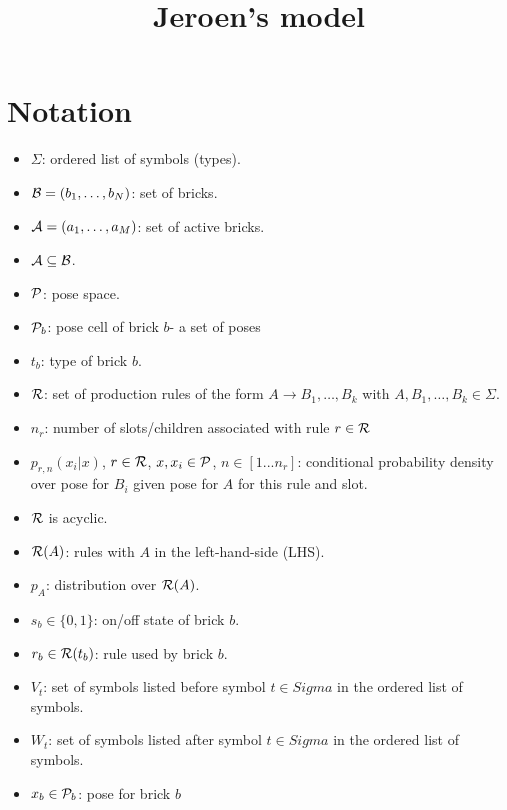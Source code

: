 \documentclass[11pt]{article}
\begin{document}
\title{Jeroen's model}
\maketitle

\section{Notation}

\begin{itemize}

\item $\Sigma$: ordered list of symbols (types).

\item ${\cal B} = (b_1,\ldots,b_N)$: set of bricks.

\item ${\cal A} = (a_1,\ldots,a_M)$: set of active bricks.

\item ${\cal A} \subseteq {\cal B}$.

\item ${\cal P}$: pose space.

\item ${\cal P}_b$: pose cell of brick $b$- a set of poses

\item $t_b$: type of brick $b$.

\item ${\cal R}$: set of production rules of the form
$A \rightarrow B_1,\ldots,B_k$ with $A,B_1,\ldots,B_k \in \Sigma$.

\item $n_r$: number of slots/children associated with rule $r \in {\cal R}$

\item $p_{r,n}(x_i|x)$, $r \in {\cal R}$, $x,x_i \in {\cal P}$, $n \in [1...n_r]$: 
conditional probability density over pose for $B_i$ given pose for $A$ for this rule and slot.

\item ${\cal R}$ is acyclic.

\item ${\cal R}(A)$: rules with $A$ in the left-hand-side (LHS).

\item $p_A$: distribution over ${\cal R}(A)$.

\item $s_b \in \{0,1\}$: on/off state of brick $b$.

\item $r_b \in {\cal R}(t_b)$: rule used by brick $b$.

\item $V_t$: set of symbols listed before symbol $t \in Sigma$ in the ordered list of symbols.

\item $W_t$: set of symbols listed after symbol $t \in Sigma$ in the ordered list of symbols.

\item $x_b \in {\cal P}_b$: pose for brick $b$

\end{itemize}
\end{document}
